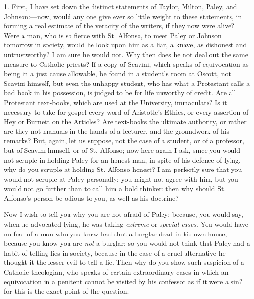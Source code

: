 1. First, I have set down the distinct statements of Taylor, Milton,
Paley, and Johnson:—now, would any one give ever so little weight to
these statements, in forming a real estimate of the veracity of the
writers, if they now were alive? Were a man, who is so fierce with St.
Alfonso, to meet Paley or Johnson tomorrow in society, would he look
upon him as a liar, a knave, as dishonest and untrustworthy? I am sure
he would not. Why then does he not deal out the same measure to Catholic
priests? If a copy of Scavini, which speaks of equivocation as being in
a just cause allowable, be found in a student's room at Oscott, not
Scavini himself, but even the unhappy student, who has what a
Protestant calls a bad book in his possession, is judged to be
for life unworthy of credit. Are all Protestant text-books,
which are used at the University, immaculate? Is it
necessary to take for gospel every word of Aristotle's Ethics, or every
assertion of Hey or Burnett on the Articles? Are text-books the ultimate
authority, or rather are they not manuals in the hands
of a lecturer, and the groundwork of his remarks? But, again, let us
suppose, not the case of a student, or of a professor, but of Scavini
himself, or of St. Alfonso; now here again I ask, since you
would not scruple in holding Paley for an honest man, in spite of his
defence of lying, why do you scruple at holding St. Alfonso honest? I am perfectly sure that you would not scruple at Paley
personally; you might not agree with him, but you would not go
further than to call him a bold thinker: then why should St.
Alfonso's person be odious to you, as well as his doctrine?

Now I wish to tell you why you are not afraid of Paley; because, you
would say, when he advocated lying, he was taking \emph{extreme} or \emph{special
cases}. You would have no fear of a man who you knew had shot
a burglar dead in his own house, because you know you are \emph{not} a
burglar: so you would not think that Paley had a habit of telling lies
in society, because in the case of a cruel alternative he thought it the
lesser evil to tell a lie. Then why do you show such suspicion of a
Catholic theologian, who speaks of certain extraordinary cases in
which an equivocation in a penitent cannot be visited by his confessor
as if it were a sin? for this is the exact point of the question.

